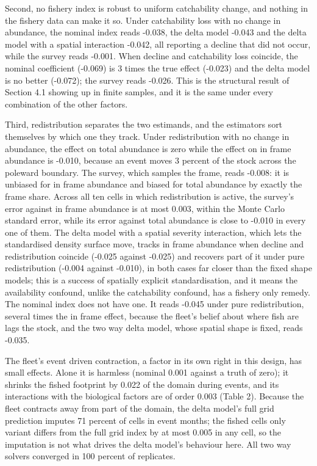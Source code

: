 \documentclass[
  11pt,
  a4paper,
]{article}
\begin{document}
Second, no fishery index is robust to uniform catchability change, and
nothing in the fishery data can make it so. Under catchability loss with
no change in abundance, the nominal index reads -0.038, the delta model
-0.043 and the delta model with a spatial interaction -0.042, all
reporting a decline that did not occur, while the survey reads -0.001.
When decline and catchability loss coincide, the nominal coefficient
(-0.069) is 3 times the true effect (-0.023) and the delta model is no
better (-0.072); the survey reads -0.026. This is the structural result
of Section 4.1 showing up in finite samples, and it is the same under
every combination of the other factors.

Third, redistribution separates the two estimands, and the estimators
sort themselves by which one they track. Under redistribution with no
change in abundance, the effect on total abundance is zero while the
effect on in frame abundance is -0.010, because an event moves 3 percent
of the stock across the poleward boundary. The survey, which samples the
frame, reads -0.008: it is unbiased for in frame abundance and biased
for total abundance by exactly the frame share. Across all ten cells in
which redistribution is active, the survey's error against in frame
abundance is at most 0.003, within the Monte Carlo standard error, while
its error against total abundance is close to -0.010 in every one of
them. The delta model with a spatial severity interaction, which lets
the standardised density surface move, tracks in frame abundance when
decline and redistribution coincide (-0.025 against -0.025) and recovers
part of it under pure redistribution (-0.004 against -0.010), in both
cases far closer than the fixed shape models; this is a success of
spatially explicit standardisation, and it means the availability
confound, unlike the catchability confound, has a fishery only remedy.
The nominal index does not have one. It reads -0.045 under pure
redistribution, several times the in frame effect, because the fleet's
belief about where fish are lags the stock, and the two way delta model,
whose spatial shape is fixed, reads -0.035.

The fleet's event driven contraction, a factor in its own right in this
design, has small effects. Alone it is harmless (nominal 0.001 against a
truth of zero); it shrinks the fished footprint by 0.022 of the domain
during events, and its interactions with the biological factors are of
order 0.003 (Table 2). Because the fleet contracts away from part of the
domain, the delta model's full grid prediction imputes 71 percent of
cells in event months; the fished cells only variant differs from the
full grid index by at most 0.005 in any cell, so the imputation is not
what drives the delta model's behaviour here. All two way solvers
converged in 100 percent of replicates.
\end{document}
